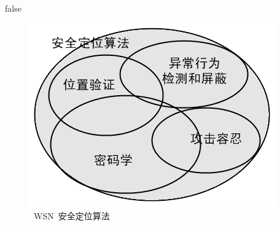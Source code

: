 \documentclass[a4paper,10pt]{article}
\begin{document}
\if false
\begin{figure}[htbp]
  \centering
  \includegraphics[width=.9\textwidth,keepaspectratio]{wsn_sec_pos}
  \caption{\label{wsn_sec_pos}~WSN~安全定位算法}
\end{figure}
\fi
\end{document}
